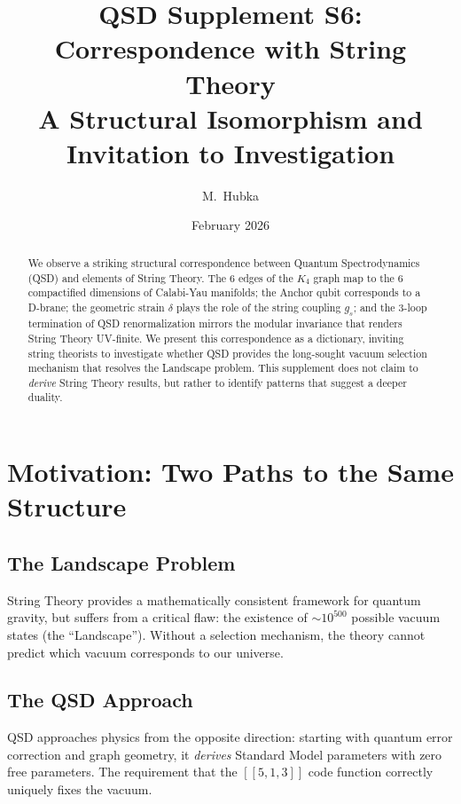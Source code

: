 \documentclass[11pt,a4paper]{article}
\title{\textbf{QSD Supplement S6: Correspondence with String Theory}\\[0.5em]
\Large A Structural Isomorphism and Invitation to Investigation}
\author{M.\ Hubka}
\date{February 2026}
\theoremstyle{definition}
\newcommand{\dgeo}{\delta}
\newcommand{\gs}{g_s}
\begin{document}
\maketitle

\begin{abstract}
We observe a striking structural correspondence between Quantum Spectrodynamics (QSD) and elements of String Theory. The 6 edges of the $K_4$ graph map to the 6 compactified dimensions of Calabi-Yau manifolds; the Anchor qubit corresponds to a D-brane; the geometric strain $\dgeo$ plays the role of the string coupling $\gs$; and the 3-loop termination of QSD renormalization mirrors the modular invariance that renders String Theory UV-finite. We present this correspondence as a dictionary, inviting string theorists to investigate whether QSD provides the long-sought vacuum selection mechanism that resolves the Landscape problem. This supplement does not claim to \emph{derive} String Theory results, but rather to identify patterns that suggest a deeper duality.
\end{abstract}

\tableofcontents

\section{Motivation: Two Paths to the Same Structure}
\label{sec:motivation}

\subsection{The Landscape Problem}

String Theory provides a mathematically consistent framework for quantum gravity, but suffers from a critical flaw: the existence of $\sim 10^{500}$ possible vacuum states (the ``Landscape''). Without a selection mechanism, the theory cannot predict which vacuum corresponds to our universe.

\subsection{The QSD Approach}

QSD approaches physics from the opposite direction: starting with quantum error correction and graph geometry, it \emph{derives} Standard Model parameters with zero free parameters. The requirement that the $[[5,1,3]]$ code function correctly uniquely fixes the vacuum.
\end{document}
